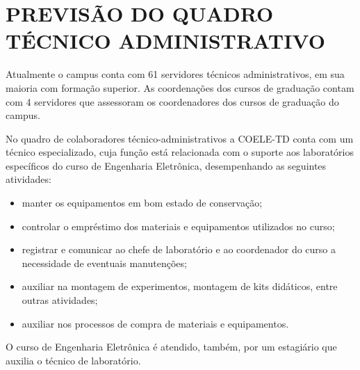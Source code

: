 \chapter{PREVISÃO DO QUADRO TÉCNICO ADMINISTRATIVO}

Atualmente o campus conta com 61 servidores técnicos administrativos, em sua maioria com formação superior. As coordenações dos cursos de graduação contam com 4 servidores que assessoram os coordenadores dos cursos de graduação do campus.

No quadro de colaboradores técnico-administrativos a COELE-TD conta com um técnico especializado, cuja função está relacionada com o suporte aos laboratórios específicos do curso de Engenharia Eletrônica, desempenhando as seguintes atividades:

\begin{itemize}
    \item manter os equipamentos em bom estado de conservação;
    \item controlar o empréstimo dos materiais e equipamentos utilizados no curso;
    \item registrar e comunicar ao chefe de laboratório e ao coordenador do curso a necessidade de eventuais manutenções;
    \item auxiliar na montagem de experimentos, montagem de kits didáticos, entre outras atividades;
    \item auxiliar nos processos de compra de materiais e equipamentos.
\end{itemize}
    
O curso de Engenharia Eletrônica é atendido, também, por um estagiário que auxilia o técnico de laboratório.